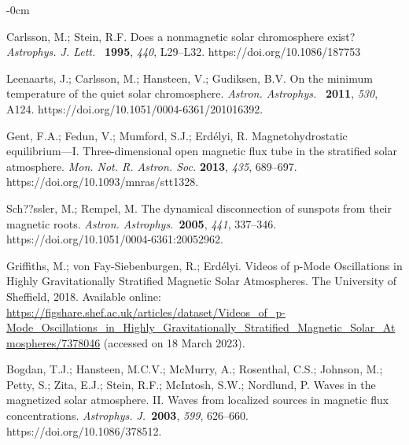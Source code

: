 \documentclass[physics,article,accept,pdftex,moreauthors]{Definitions/mdpi}
\newcommand{\aap}{{\it Astron. Astrophys.}}
\newcommand{\apj}{{\it Astrophys. J.}}
\newcommand{\apjl}{{\it Astrophys. J. Lett.}}
\begin{document}
\begin{adjustwidth}{-\extralength}{0cm}
\begin{thebibliography}{999}
		{Carlsson}, M.; {Stein}, R.F. {Does a nonmagnetic solar chromosphere
			exist?} \apjl~ \textbf{1995}, \emph{440}, L29--L32.
  {https://doi.org/10.1086/187753} 		

		Leenaarts, J.; Carlsson, M.; Hansteen, V.; Gudiksen, B.V. On the minimum temperature of the quiet solar chromosphere. \aap~ \textbf{2011}, \emph{530}, A124. https://doi.org/10.1051/0004-6361/201016392.
		
		Gent, F.A.; Fedun, V.; Mumford, S.J.; Erd\'elyi, R. Magnetohydrostatic 
equilibrium---I. Three-dimensional open magnetic flux tube in the stratified solar atmosphere. \emph{Mon. Not. R. Astron. Soc.} \textbf{2013}, \emph{435}, 689--697. https://doi.org/10.1093/mnras/stt1328.
		
		Sch??ssler, M.; Rempel, M. The dynamical disconnection of sunspots from their magnetic roots. \aap~\textbf{2005}, \emph{441}, 337--346. https://doi.org/10.1051/0004-6361:20052962.
		
		{Griffiths}, M.; 
  {von Fay-Siebenburgen, R.;} %
{Erd{\'e}lyi}. %
{Videos of p-Mode Oscillations in Highly Gravitationally Stratified Magnetic Solar Atmospheres}. 
 {The University of Sheffield,} %
2018. Available online: 
\url{https://figshare.shef.ac.uk/articles/dataset/Videos_of_p-Mode_Oscillations_in_Highly_Gravitationally_Stratified_Magnetic_Solar_Atmospheres/7378046} 
({accessed on 18 March 2023}).
		
		Bogdan, T.J.; Hansteen, M.C.V.; McMurry, A.; Rosenthal, C.S.; Johnson, M.; Petty, S.; Zita, E.J.; Stein, R.F.; McIntosh, 
S.W.; Nordlund, P. Waves in the magnetized solar atmosphere. II. Waves from localized sources in magnetic flux concentrations. \apj~\textbf{2003}, \emph{599}, 626--660. https://doi.org/10.1086/378512.
		

\end{thebibliography}
\end{adjustwidth}
\end{document}
